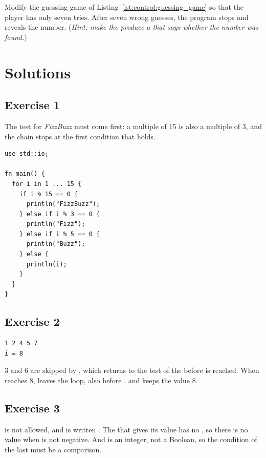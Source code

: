 Modify the guessing game of Listing~\ref{lst:control:guessing_game} so that the
player has only seven tries. After seven wrong guesses, the program stops and
reveals the number. (\textit{Hint: make the  produce a 
that says whether the number was found.})

\vfill%
\pagebreak

\forceevenpage{}

\section*{Solutions}
%
\subsection*{Exercise 1}

The test for \textit{FizzBuzz} must come first: a multiple of 15 is also a
multiple of 3, and the chain stops at the first condition that holds.

\begin{lstlisting}[style=coloredverbatim, caption=Solution for exercise 1]
use std::io;

fn main() {
  for i in 1 ... 15 {
    if i % 15 == 0 {
      println("FizzBuzz");
    } else if i % 3 == 0 {
      println("Fizz");
    } else if i % 5 == 0 {
      println("Buzz");
    } else {
      println(i);
    }
  }
}
\end{lstlisting}

\subsection*{Exercise 2}

\begin{lstlisting}[style=bashVerb]
1 2 4 5 7
i = 8
\end{lstlisting}

3 and 6 are skipped by , which returns to the test of the
 before  is reached. When  reaches 8,
 leaves the loop, also before , and  keeps the
value 8.

\subsection*{Exercise 3}

 is not allowed, and is written . The 
that gives  its value has no , so there is no value when
 is not negative. And  is an integer, not a Boolean, so the
condition of the last  must be a comparison.

